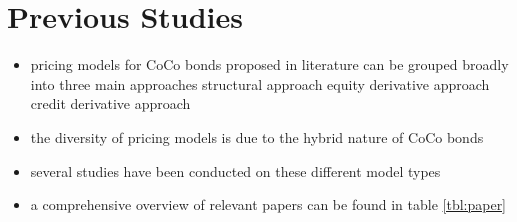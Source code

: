 

\section{Previous Studies}

\begin{itemize}
\item pricing models for CoCo bonds proposed in literature can be grouped broadly into three main approaches
\subitem structural approach
\subitem equity derivative approach
\subitem credit derivative approach
\item the diversity of pricing models is due to the hybrid nature of CoCo bonds
\item several studies have been conducted on these different model types
\item a comprehensive overview of relevant papers can be found in table \ref{tbl:paper}
\end{itemize}

